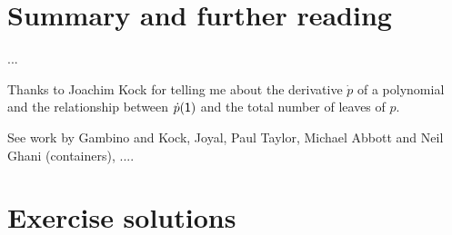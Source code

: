 \documentclass[Book-Poly]{subfiles}
\begin{document}
\section{Summary and further reading}

...

Thanks to Joachim Kock for telling me about the derivative $\dot{p}$ of a polynomial and the relationship between $\dot{p}(\textsf{1})$ and the total number of leaves of $p$.


See work by Gambino and Kock, Joyal, Paul Taylor, Michael Abbott and Neil Ghani (containers), ....


\section{Exercise solutions}
\footnotesize

\end{document}
